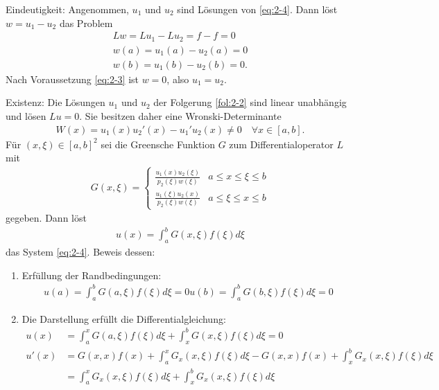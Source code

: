 \begin{beweis}
  Eindeutigkeit: Angenommen, $u_{1}$ und $u_{2}$ sind Lösungen von \eqref{eq:2-4}. Dann löst $w = u_{1} - u_{2}$ das Problem
  \begin{align*}
    Lw = Lu_{1} - Lu_{2} = f-f = 0\\
    w(a) = u_{1}(a) - u_{2}(a) =0 \\
    w(b) = u_{1}(b) - u_{2}(b) =0. 
  \end{align*}
Nach Voraussetzung \eqref{eq:2-3} ist $w = 0$, also $u_{1} = u_{2}$. 

Existenz: Die Lösungen $u_{1}$ und $u_{2}$ der Folgerung \ref{fol:2-2} sind linear unabhängig und lösen $Lu = 0$. Sie besitzen daher eine Wronski-Determinante
\begin{align*}
  W(x) = u_{1}(x) u_{2}' (x) - u_{1}' u_{2}(x) \neq 0 \quad \forall x \in [a, b]. 
\end{align*}
Für $(x, \xi) \in [a, b]^{2}$ sei die Greensche Funktion $G$ zum Differentialoperator $L$ mit
\begin{align*}
  G(x, \xi) =
  \begin{cases}
    \frac{u_{1}(x) u_{2}(\xi)}{p_{2}(\xi) w(\xi)} & a \leq x \leq \xi \leq b\\
    \frac{u_{1}(\xi) u_{2}(x)}{p_{2}(\xi) w(\xi)} & a \leq \xi \leq x \leq b
  \end{cases}
\end{align*}
gegeben. Dann löst
\begin{align*}
  u(x) = \int_{a}^{b} G(x, \xi)f(\xi) d\xi
\end{align*}
das System \eqref{eq:2-4}.
Beweis dessen: 
\begin{enumerate}
\item Erfüllung der Randbedingungen: 
  \begin{align*}
    u(a) = \int_{a}^{b} G(a, \xi)f(\xi) d\xi = 0
    u(b) = \int_{a}^{b} G(b, \xi)f(\xi) d\xi = 0
  \end{align*}
\item Die Darstellung erfüllt die Differentialgleichung:
  \begin{align*}
    u(x) &= \int_{a}^{x} G(a, \xi)f(\xi) d\xi  + \int_{x}^{b} G(x, \xi)f(\xi) d\xi = 0\\
    u'(x) &= G(x, x) f(x) + \int_{a}^{x} G_{x}(x, \xi)f(\xi) d\xi  - G(x, x)f(x)  + \int_{x}^{b} G_{x}(x, \xi)f(\xi) d\xi \\
    &= \int_{a}^{x} G_{x}(x, \xi)f(\xi) d\xi    + \int_{x}^{b} G_{x}(x, \xi)f(\xi) d\xi\\

\end{align*}
\end{enumerate}
\end{beweis}
